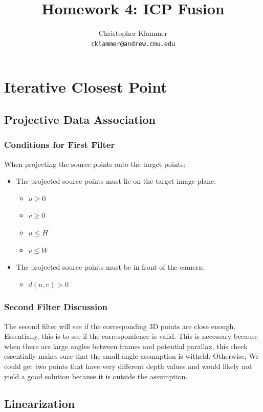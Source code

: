\documentclass[12pt, a4paper]{article}
\title{Homework 4: ICP Fusion}
\author{Christopher Klammer \\ \small\texttt{cklammer@andrew.cmu.edu}}
\begin{document}
\maketitle

\section{Iterative Closest Point}
\subsection{Projective Data Association}
\subsubsection{Conditions for First Filter}
When projecting the source points onto the target points:
\begin{itemize}
    \item The projected source points must lie on the target image plane:
    
    \begin{itemize}
        \item $u \geq 0$
        \item $v \geq 0$
        \item $u \le H$
        \item $v \le W$
    \end{itemize}

    \item The projected source points must be in front of the camera:
    \begin{itemize}
        \item $d(u,v) > 0$
    \end{itemize}
\end{itemize}
\subsubsection{Second Filter Discussion}
The second filter will see if the corresponding 3D points are close enough. Essentially, this is to see if the correspondence is valid. This is necessary because when there are large angles between frames and potential parallax, this check essentially makes sure that the small angle assumption is witheld. Otherwise, We could get two points that have very different depth values and would likely not yield a good solution because it is outside the assumption.
\subsection{Linearization}
\end{document}
